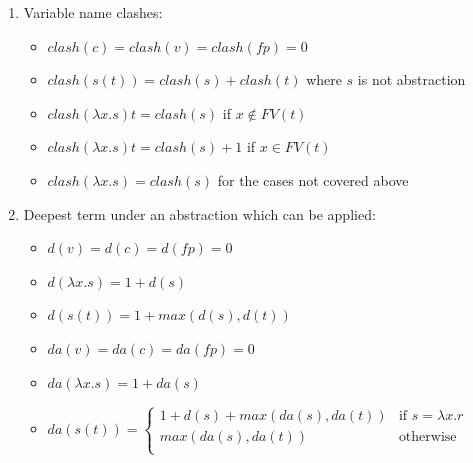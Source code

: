 \documentclass[a4paper]{article}
\begin{document}
\begin{enumerate}
\item Variable name clashes:
  \begin{itemize}
  \item $clash(c)=clash(v)=clash(fp)=0$
  \item $clash(s(t)) = clash(s) + clash(t)$ where $s$ is not abstraction
  \item $clash(\lambda x . s) t = clash(s)$ if $x \not \in FV(t)$
  \item $clash(\lambda x . s) t = clash(s) + 1$ if $x \in FV(t)$
  \item $clash(\lambda x . s) = clash(s)$ for the cases not covered above
  \end{itemize}

% 

  
\item Deepest term under an abstraction which can be applied:
  \begin{itemize}
  \item $d(v)=d(c)=d(fp)=0$
  \item $d(\lambda x . s)=1 + d(s)$
  \item $d(s(t))= 1 + max(d(s), d(t))$
  \end{itemize}

  \begin{itemize}
  \item $da(v)=da(c)=da(fp)=0$
  \item $da(\lambda x . s)=1 + da(s)$
  \item $da(s(t))= \left\{
      \begin{array}{rl}
        1 + d(s) + max(da(s),da(t))&\mbox{if }s=\lambda x.r\\
        max(da(s),da(t))&\mbox{otherwise}\\
      \end{array}\right.$
  \end{itemize}

\end{enumerate}
\end{document}
